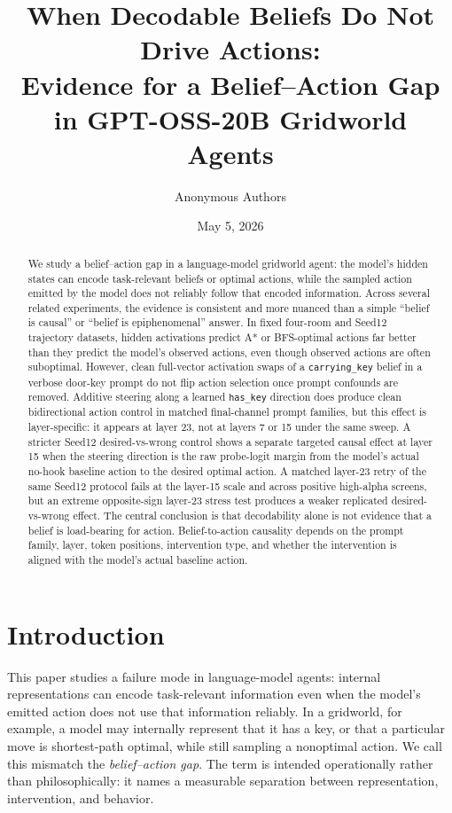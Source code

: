 \documentclass[11pt]{article}
\title{When Decodable Beliefs Do Not Drive Actions:\\
Evidence for a Belief--Action Gap in GPT-OSS-20B Gridworld Agents}
\author{Anonymous Authors}
\date{May 5, 2026}
\begin{document}
\maketitle

\begin{abstract}
We study a belief--action gap in a language-model gridworld agent: the model's hidden states can encode task-relevant beliefs or optimal actions, while the sampled action emitted by the model does not reliably follow that encoded information.
Across several related experiments, the evidence is consistent and more nuanced than a simple ``belief is causal'' or ``belief is epiphenomenal'' answer.
In fixed four-room and Seed12 trajectory datasets, hidden activations predict A* or BFS-optimal actions far better than they predict the model's observed actions, even though observed actions are often suboptimal.
However, clean full-vector activation swaps of a \texttt{carrying\_key} belief in a verbose door-key prompt do not flip action selection once prompt confounds are removed.
Additive steering along a learned \texttt{has\_key} direction does produce clean bidirectional action control in matched final-channel prompt families, but this effect is layer-specific: it appears at layer 23, not at layers 7 or 15 under the same sweep.
A stricter Seed12 desired-vs-wrong control shows a separate targeted causal effect at layer 15 when the steering direction is the raw probe-logit margin from the model's actual no-hook baseline action to the desired optimal action.
A matched layer-23 retry of the same Seed12 protocol fails at the layer-15 scale and across positive high-alpha screens, but an extreme opposite-sign layer-23 stress test produces a weaker replicated desired-vs-wrong effect.
The central conclusion is that decodability alone is not evidence that a belief is load-bearing for action.
Belief-to-action causality depends on the prompt family, layer, token positions, intervention type, and whether the intervention is aligned with the model's actual baseline action.
\end{abstract}

\section{Introduction}

This paper studies a failure mode in language-model agents: internal representations can encode task-relevant information even when the model's emitted action does not use that information reliably.
In a gridworld, for example, a model may internally represent that it has a key, or that a particular move is shortest-path optimal, while still sampling a nonoptimal action.
We call this mismatch the \emph{belief--action gap}.
The term is intended operationally rather than philosophically: it names a measurable separation between representation, intervention, and behavior.
\end{document}
